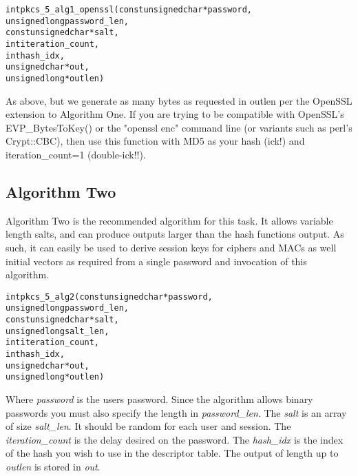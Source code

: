 \documentclass[synpaper]{book}
\begin{document}
\begin{alltt}
int pkcs_5_alg1_openssl(const unsigned char *password,
                      unsigned long  password_len,
                const unsigned char *salt,
                                int  iteration_count,
                                int  hash_idx,
                      unsigned char *out,
                      unsigned long *outlen)
\end{alltt}
As above, but we generate as many bytes as requested in outlen per the OpenSSL extension to Algorithm One.  If you are trying to be compatible with OpenSSL's EVP\_BytesToKey() or the "openssl enc" command line (or variants such as perl's Crypt::CBC), then use this function with MD5 as your hash (ick!) and iteration\_count=1 (double-ick!!).
\subsection{Algorithm Two}

Algorithm Two is the recommended algorithm for this task.  It allows variable length salts, and can produce outputs larger than the
hash functions output.  As such, it can easily be used to derive session keys for ciphers and MACs as well initial vectors as required
from a single password and invocation of this algorithm.

\begin{alltt}
int pkcs_5_alg2(const unsigned char *password,
                      unsigned long  password_len,
                const unsigned char *salt,
                      unsigned long  salt_len,
                                int  iteration_count,
                                int  hash_idx,
                      unsigned char *out,
                      unsigned long *outlen)
\end{alltt}
Where \textit{password} is the users password.  Since the algorithm allows binary passwords you must also specify the length in \textit{password\_len}.
The \textit{salt} is an array of size \textit{salt\_len}.  It should be random for each user and session.  The \textit{iteration\_count} is the delay desired
on the password.  The \textit{hash\_idx} is the index of the hash you wish to use in the descriptor table.   The output of length up to
\textit{outlen} is stored in \textit{out}.
\end{document}
